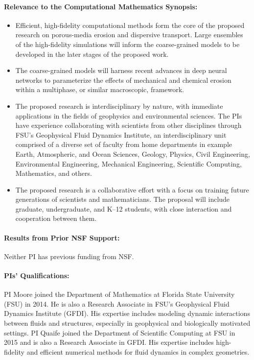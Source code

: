 \documentclass[11pt]{article}
\begin{document}
\paragraph{Relevance to the Computational Mathematics Synopsis:}
\begin{itemize}[noitemsep]
  \item Efficient, high-fidelity computational methods form the core of the proposed research on porous-media erosion and dispersive transport. Large ensembles of the high-fidelity simulations will inform the coarse-grained models to be developed in the later stages of the proposed work.

\item The coarse-grained models will harness recent advances in deep neural networks \cite{ling2016reynolds, kutz2017deep, ling2016machine, pelt2018mixed} to parameterize the effects of mechanical and chemical erosion within a multiphase\cite{breward2003multiphase, cogan2010multiphase, Imma2019, eastham2019multiphase}, or similar macroscopic, framework.

  \item The proposed research is interdisciplinary by nature, with immediate applications in the fields of geophysics and environmental sciences. The PIs have experience collaborating with scientists from other disciplines \cite{Caves2018, eastham2019multiphase, Bolles2019, cur-spe-hie-obr-goo-qua2018} through FSU's Geophysical Fluid Dynamics Institute, an interdisciplinary unit comprised of a diverse set of faculty from home departments in example Earth, Atmospheric, and Ocean Sciences, Geology, Physics, Civil Engineering, Environmental Engineering, Mechanical Engineering, Scientific Computing, Mathematics, and others.

  \item The proposed research is a collaborative effort with a focus on training future generations of scientists and mathematicians. The proposal will include graduate, undergraduate, and K--12 students, with close interaction and cooperation between them.
\end{itemize}

\paragraph{Results from Prior NSF Support:} Neither PI has previous funding from NSF.

\paragraph{PIs' Qualifications:} PI Moore joined the Department of Mathematics at Florida State University (FSU) in 2014. He is also a Research Associate in FSU's Geophysical Fluid Dynamics Institute (GFDI).  His expertise includes modeling dynamic interactions between fluids and structures, especially in geophysical and biologically motivated settings. PI Quaife joined the Department of Scientific Computing at FSU in 2015 and is also a Research Associate in GFDI. His expertise includes high-fidelity and efficient numerical methods for fluid dynamics in complex geometries.
\end{document}
